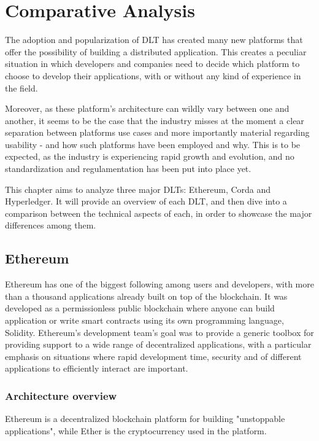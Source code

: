 \chapter{Comparative Analysis}
\label{chap:comparative-analysis}

The adoption and popularization of DLT has created many new platforms that offer the possibility of building a distributed application.
This creates a peculiar situation in which developers and companies need to decide which platform to choose to develop their applications, with or without any kind of experience in the field.

Moreover, as these platform's architecture can wildly vary between one and another, it seems to be the case that the industry misses at the moment a clear separation between platforms use cases and more importantly material regarding usability - and how such platforms have been employed and why. This is to be expected, as the industry is experiencing rapid growth and evolution, and no standardization and regulamentation has been put into place yet.

This chapter aims to analyze three major DLTs: Ethereum, Corda and Hyperledger. It will provide an overview of each DLT, and then dive into a comparison between the technical aspects of each, in order to showcase the major differences among them.

\section{Ethereum}

Ethereum has one of the biggest following among users and developers, with more than a thousand applications already built on top of the blockchain. It was developed as a permissionless public blockchain where anyone can build application or write smart contracts using its own programming language, Solidity. Ethereum's development team's goal was to provide a generic toolbox for providing support to a wide range of decentralized applications, with a particular emphasis on situations where rapid development time, security and of different applications to efficiently interact are important.

\subsection{Architecture overview}

Ethereum is a decentralized blockchain platform for building "unstoppable applications", while Ether is the cryptocurrency used in the platform.

